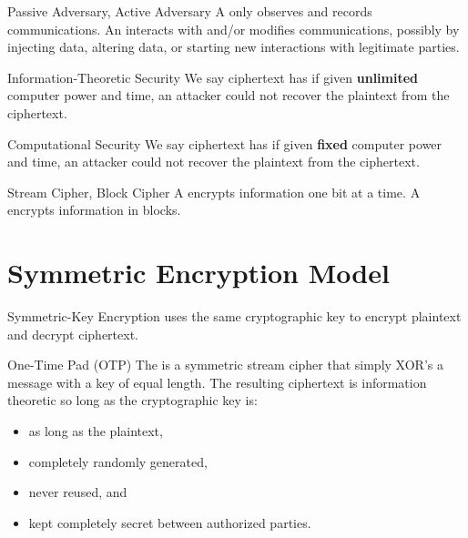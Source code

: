 \begin{dfnbox}{Passive Adversary, Active Adversary}{}
    A  only observes and records communications. An  interacts with and/or modifies communications, possibly by injecting data, altering data, or starting new interactions with legitimate parties.
\end{dfnbox}


\begin{dfnbox}{Information-Theoretic Security}{}
    We say ciphertext has  if given \textbf{unlimited} computer power and time, an attacker could not recover the plaintext from the ciphertext.
\end{dfnbox}

\begin{dfnbox}{Computational Security}{}
    We say ciphertext has  if given \textbf{fixed} computer power and time, an attacker could not recover the plaintext from the ciphertext.
\end{dfnbox}

\begin{dfnbox}{Stream Cipher, Block Cipher}{}
    A  encrypts information one bit at a time.     A  encrypts information in blocks.
\end{dfnbox}

\section{Symmetric Encryption Model}

\begin{dfnbox}{Symmetric-Key Encryption}{}
     uses the same cryptographic key to encrypt plaintext and decrypt ciphertext.
\end{dfnbox}

\begin{dfnbox}{One-Time Pad (OTP)}{}
    The  is a symmetric stream cipher that simply XOR's a message with a key of equal length. The resulting ciphertext is information theoretic so long as the cryptographic key is:
    \begin{itemize}[noitemsep]
        \item as long as the plaintext,
        \item completely randomly generated,
        \item never reused, and
        \item kept completely secret between authorized parties.
   \end{itemize}
\end{dfnbox}

